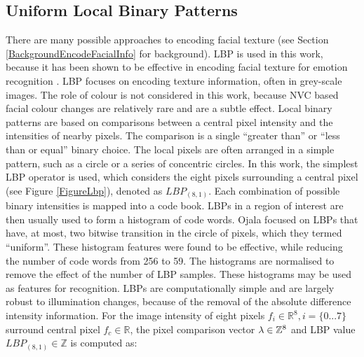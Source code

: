 
\subsection{Uniform Local Binary Patterns}

There are many possible approaches to encoding facial texture (see Section \ref{BackgroundEncodeFacialInfo} for background). \acf{LBP} \cite{Ojala2002} is used in this work, because it has been shown to be effective in encoding facial texture for emotion recognition \cite{Shan2009}. \ac{LBP} focuses on encoding texture information, often in grey-scale images. The role of colour is not considered in this work, because \ac{NVC} based facial colour changes are relatively rare and are a subtle effect. Local binary patterns are based on comparisons between a central pixel intensity and the intensities of nearby pixels. The comparison is a single ``greater than'' or ``less than or equal'' binary choice. The local pixels are often arranged in a simple pattern, such as a circle or a series of concentric circles. In this work, the simplest \ac{LBP} operator is used, which considers the eight pixels surrounding a central pixel (see Figure \ref{FigureLbp}), denoted as $LBP_{(8,1)}$. Each combination of possible binary intensities is mapped into a code book. \ac{LBP}s in a region of interest are then usually used to form a histogram of code words. Ojala \etal \cite{Ojala2002} focused on \ac{LBP}s that have, at most, two bitwise transition in the circle of pixels, which they termed ``uniform''. These histogram features were found to be effective, while reducing the number of code words from 256 to 59. The histograms are normalised to remove the effect of the number of \ac{LBP} samples. These histograms may be used as features for recognition. \ac{LBP}s are computationally simple and are largely robust to illumination changes, because of the removal of the absolute difference intensity information. For the image intensity of eight pixels $f_i \in \mathbb{R} ^ {8}, i = \{0...7\}$ surround central pixel $f_c \in \mathbb{R}$, the pixel comparison vector $\lambda \in \mathbb{Z} ^ {8}$ and \ac{LBP} value $LBP_{(8,1)} \in \mathbb{Z}$ is computed as:

